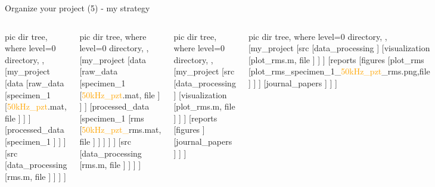 \documentclass[10pt,aspectratio=169,notes]{beamer} %
\begin{document}
\begin{frame}[t]{Organize your project (5) - my strategy}
\vspace{-5mm}
\begin{columns}[T]
	\centering
	{
	\begin{forest}
		pic dir tree,
		where level=0{}{%
			directory,
		},
		[my\_project
		[data
		[raw\_data
			[specimen\_1
				[\textcolor{orange}{50kHz\_pzt}.mat, file
				]
			]
		]
		[processed\_data
			[specimen\_1
			]
		]
		]
		[src
			[data\_processing
				[\alert{rms}.m, file
				]
			]
		]
		]
	\end{forest}
	}
	{
		\begin{forest}
			pic dir tree,
			where level=0{}{%
				directory,
			},
			[my\_project
			[data
			[raw\_data
				[specimen\_1
					[\textcolor{orange}{50kHz\_pzt}.mat, file
					]
				]
			]
			[processed\_data
				[specimen\_1
					[\alert{rms}
						[\textcolor{orange}{50kHz\_pzt\_}\alert{rms}.mat, file
						]
					]
				]
			]
			]
			[src
				[data\_processing
					[\alert{rms}.m, file
					]
				]
			]
			]
		\end{forest}
	}
	\centering
	{
	\begin{forest}
		pic dir tree,
		where level=0{}{%
			directory,
		},
		[my\_project
		[src
			[data\_processing
			]
			[visualization
				[\textcolor{logoblue}{plot\_rms}.m, file
				]
			]
		]
		[reports
			[figures
			]
			[journal\_papers
			]
		]
		]
	\end{forest}
	}
	{
	\begin{forest}
		pic dir tree,
		where level=0{}{%
			directory,
		},
		[my\_project
		[src
			[data\_processing
			]
			[visualization
				[\textcolor{logoblue}{plot\_rms}.m, file
				]
			]
		]
		[reports
			[figures
				[\textcolor{logoblue}{plot\_rms}
					[\textcolor{logoblue}{plot\_rms}\_specimen\_1\_\textcolor{orange}{50kHz\_pzt}\_\alert{rms}.png,file
					]
				]
			]
			[journal\_papers
			]
		]
		]
	\end{forest}
	}
\end{columns}	
\end{frame}
\end{document}
